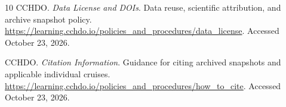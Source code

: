 \documentclass[11pt,letterpaper]{article}
\begin{document}
\begin{thebibliography}{10}
CCHDO. \emph{Data License and DOIs}. Data reuse, scientific attribution, and archive snapshot policy.
\url{https://learning.cchdo.io/policies_and_procedures/data_license}.
Accessed October 23, 2026.

CCHDO. \emph{Citation Information}. Guidance for citing archived snapshots and applicable individual cruises.
\url{https://learning.cchdo.io/policies_and_procedures/how_to_cite}.
Accessed October 23, 2026.

\end{thebibliography}
\end{document}
